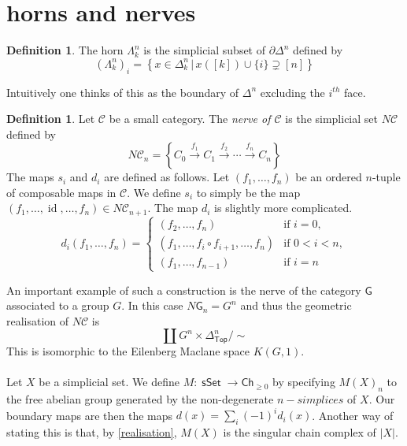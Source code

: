 \documentclass{amsart}
\DeclareMathOperator{\Top}{\mathsf{Top}}
\DeclareMathOperator{\msset}{\mathsf{sSet}}
\DeclareMathOperator{\id}{id} \DeclareMathOperator{\Fun}{Fun}
\theoremstyle{definition}
\newtheorem{definition}[theorem]{Definition}
\begin{document}
\section{horns and nerves}
\begin{definition}
  The horn $\Lambda^n_k$ is the simplicial subset of $\partial \Delta^n$ defined
  by
  $$
  (\Lambda^n_k)_i = \left\{ x\in \Delta^n_k\, \big| \, x([k])\cup \{ i \} \supsetneq [n] \right \}
  $$
\end{definition}
Intuitively one thinks of this as the boundary of $\Delta^n$ excluding the $i^{th}$ face.

\begin{definition}
  Let $\mathcal{C}$ be a small category. The \textit{nerve of $\mathcal{C}$} is
  the simplicial set $N\mathcal{C}$ defined by
  $$
  N \mathcal{C}_n =  \left\{ C_0\xrightarrow{f_1}C_1\xrightarrow{f_2}\cdots \xrightarrow{f_n} C_n \right\}
  $$
  The maps $s_i$ and $d_i$ are defined as follows. Let $(f_1,\ldots, f_n)$
  be an ordered $n$-tuple of composable maps in $\mathcal{C}$. We define $s_i$
  to simply be the map $(f_1,\ldots,\id,\ldots,f_n)\in N \mathcal{C}_{n+1}$. The
  map $d_i$ is slightly more complicated.
  \[
      d_i(f_1,\ldots,f_n) =
    \begin{cases}
      (f_2,\ldots,f_n) & \text{if }i=0,\\
      (f_1,\ldots,f_i\circ f_{i+1}, \ldots, f_n) &\text{if }0<i<n,\\
      (f_1,\ldots,f_{n-1}) &\text{if }i=n
    \end{cases}
  \]
\end{definition}

An important example of such a construction is the nerve of the category
$\mathsf{G}$ associated to a group $G$. In this case $N\mathsf{G}_n=G^n$
and thus the geometric realisation of $N \mathcal{C}$ is
$$
\coprod G^n\times \Delta^n_{\Top} \big/ \sim 
$$
This is isomorphic to the Eilenberg Maclane space $K(G,1)$.
\\
\\
\indent
Let $X$ be a simplicial set. We define $M: \msset \to \mathsf{Ch}_{\geq 0}$ by
specifying $M(X)_n$ to the free abelian group generated by the non-degenerate
$n-simplices$ of $X$. Our boundary maps are then the maps $d(x)=\sum_i (-1)^i
d_i(x)$. Another way of stating this is that, by \ref{realisation}, $M(X)$ is the singular chain complex
of $|X|$.
\end{document}
